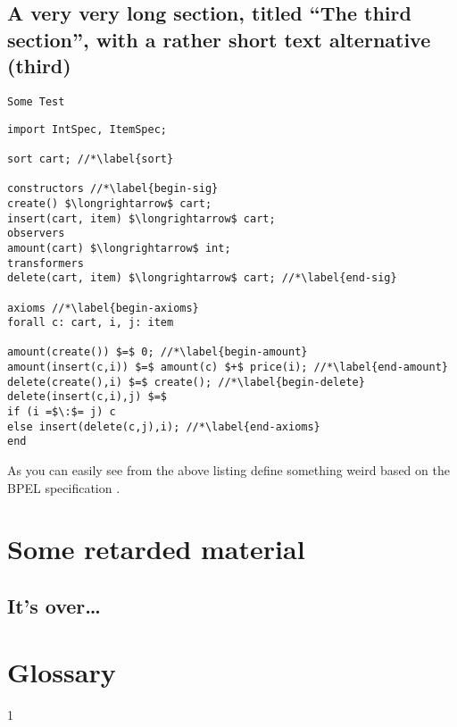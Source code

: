 \documentclass[mscthesis]{usiinfthesis}
\begin{document}
\section[third]{A very very long section, titled ``The third section'', with
  a rather  short text alternative (third)}

\texttt{Some Test}
\begin{lstlisting}
import IntSpec, ItemSpec;

sort cart; //*\label{sort}

constructors //*\label{begin-sig}
create() $\longrightarrow$ cart;
insert(cart, item) $\longrightarrow$ cart;
observers
amount(cart) $\longrightarrow$ int;
transformers
delete(cart, item) $\longrightarrow$ cart; //*\label{end-sig}

axioms //*\label{begin-axioms}
forall c: cart, i, j: item 

amount(create()) $=$ 0; //*\label{begin-amount}
amount(insert(c,i)) $=$ amount(c) $+$ price(i); //*\label{end-amount}
delete(create(),i) $=$ create(); //*\label{begin-delete}
delete(insert(c,i),j) $=$
if (i =$\:$= j) c
else insert(delete(c,j),i); //*\label{end-axioms}
end
\end{lstlisting}

As you can easily see from the above listing \citet{bbggs:iet07}
define something weird based on the BPEL specification
\citep{bpelspec}.
\nocite{*}

\appendix %

\chapter{Some retarded material}
\section{It's over\dots}

\backmatter

\chapter{Glossary} %

%
%



1
\end{document}
